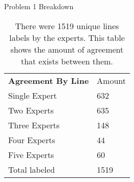 \begin{table}[htbp]
\centering
\caption{Problem 1 Breakdown}
\begin{tabular}{ll}
\textbf{Agreement By Line} & {Amount} \\
Single Expert       & 632                    \\
Two Experts         & 635                    \\
Three Experts       & 148                     \\
Four Experts        & 44                     \\
Five Experts        & 60                     \\
Total labeled       & 1519                  
\end{tabular}
\caption*{There were 1519 unique lines labels by the experts. This table shows the amount of agreement that exists between them. \label{tab:expert1}}
\end{table}